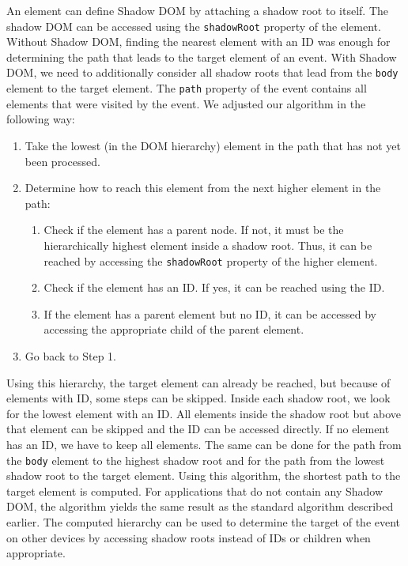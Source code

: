 An element can define Shadow DOM by attaching a shadow root to itself. The shadow DOM can be accessed using the \lstinline|shadowRoot| property of the element. Without Shadow DOM, finding the nearest element with an ID was enough for determining the path that leads to the target element of an event. With Shadow DOM, we need to additionally consider all shadow roots that lead from the \lstinline|body| element to the target element. The \lstinline|path| property of the event contains all elements that were visited by the event. We adjusted our algorithm in the following way:
\begin{enumerate}
	\item Take the lowest (in the DOM hierarchy) element in the path that has not yet been processed.
	\item Determine how to reach this element from the next higher element in the path:
	\begin{enumerate}
		\item Check if the element has a parent node. If not, it must be the hierarchically highest element inside a shadow root. Thus, it can be reached by accessing the \lstinline|shadowRoot| property of the higher element.
		\item Check if the element has an ID. If yes, it can be reached using the ID.
		\item If the element has a parent element but no ID, it can be accessed by accessing the appropriate child of the parent element.
	\end{enumerate}
	\item Go back to Step 1.
\end{enumerate}
Using this hierarchy, the target element can already be reached, but because of elements with ID, some steps can be skipped. Inside each shadow root, we look for the lowest element with an ID. All elements inside the shadow root but above that element can be skipped and the ID can be accessed directly. If no element has an ID, we have to keep all elements. The same can be done for the path from the \lstinline|body| element to the highest shadow root and for the path from the lowest shadow root to the target element. Using this algorithm, the shortest path to the target element is computed. For applications that do not contain any Shadow DOM, the algorithm yields the same result as the standard algorithm described earlier. The computed hierarchy can be used to determine the target of the event on other devices by accessing shadow roots instead of IDs or children when appropriate.

